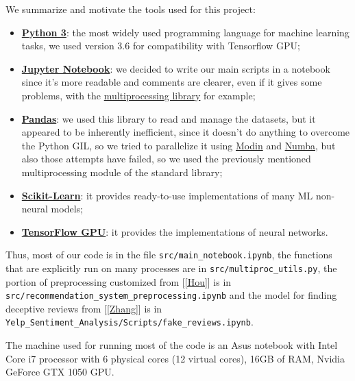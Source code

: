 We summarize and motivate the tools used for this project:
\begin{itemize}
	\item \textbf{\href{https://www.python.org/}{Python 3}}: the most widely used programming language for machine learning tasks, we used version 3.6 for compatibility with Tensorflow GPU;
	\item \textbf{\href{https://jupyter.org/}{Jupyter Notebook}}: we decided to write our main scripts in a notebook since it's more readable and comments are clearer, even if it gives some problems, with the \href{https://docs.python.org/3.6/library/multiprocessing.html}{multiprocessing library} for example;
	\item \textbf{\href{http://pandas.pydata.org}{Pandas}}: we used this library to read and manage the datasets, but it appeared to be inherently inefficient, since it doesn't do anything to overcome the Python GIL, so we tried to parallelize it using \href{https://modin.readthedocs.io/en/latest/index.html}{Modin} and \href{https://numba.pydata.org/}{Numba}, but also those attempts have failed, so we used the previously mentioned multiprocessing module of the standard library;
	\item \textbf{\href{http://scikit-learn.org}{Scikit-Learn}}: it provides ready-to-use implementations of many ML non-neural models;
	\item \textbf{\href{https://www.tensorflow.org/}{TensorFlow GPU}}: it provides the implementations of neural networks.
\end{itemize}

Thus, most of our code is in the file \texttt{src/main\_notebook.ipynb}, the functions that are explicitly run on many processes are in \texttt{src/multiproc\_utils.py}, the portion of preprocessing customized from [\ref{Hou}] is in \texttt{src/recommendation\_system\_preprocessing.ipynb} and the model for finding deceptive reviews from [\ref{Zhang}] is in \texttt{Yelp\_Sentiment\_Analysis/Scripts/fake\_reviews.ipynb}.

The machine used for running most of the code is an Asus notebook with Intel Core i7 processor with 6 physical cores (12 virtual cores), 16GB of RAM, Nvidia GeForce GTX 1050 GPU.
